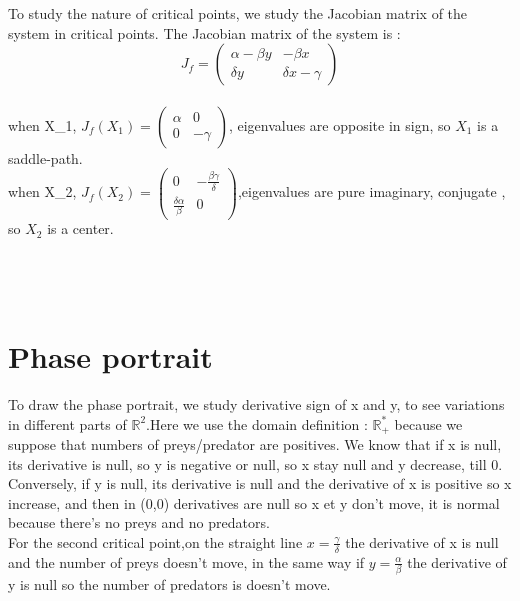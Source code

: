 \documentclass[a4paper,16pt,twoside]{report}
\def \rr {{\mathbb R}} %
\begin{document}
To study the nature of critical points, we study the Jacobian matrix of the system in critical points. The Jacobian matrix of the system is : 
\begin{equation}
    J_f = \begin{pmatrix} \alpha - \beta y & - \beta x \\ \delta y & \delta x - \gamma \end{pmatrix}
\end{equation}\\



when X_1, $J_f (X_1) =  \begin{pmatrix} \alpha & 0 \\ 0 & - \gamma \end{pmatrix}$, eigenvalues are opposite in sign, so $X_1$ is a saddle-path.\\



when X_2, $J_f(X_2) = \begin{pmatrix} 0 & - \frac{\beta \gamma}{\delta} \\ \frac{\delta \alpha}{\beta} & 0 \end{pmatrix}$,eigenvalues are pure imaginary, conjugate , so $X_2$ is a center.\\
\\
\\
\\

\section{ Phase portrait}

    To draw the phase portrait, we study derivative sign of x and y, to see variations in different parts of $\rr^2$.Here we use the domain definition : $\rr_+^*$ because we suppose that numbers of preys/predator are positives. We know that if x is null, its derivative is null, so y is negative or null, so x stay null and y decrease, till  0. Conversely, if y is null, its derivative is null and the derivative of x is positive so x increase, and then in (0,0) derivatives are null so x et y don't move, it is normal because there's no preys and no predators.\\
    
    
    
    
    For the second critical point,on the straight line $x = \frac{\gamma}{\delta}$ the derivative of x is null and the number of preys doesn't move, in the same way if $y = \frac{\alpha}{\beta}$ the derivative of y is null so the number of predators is doesn't move.\\
    
\end{document}

